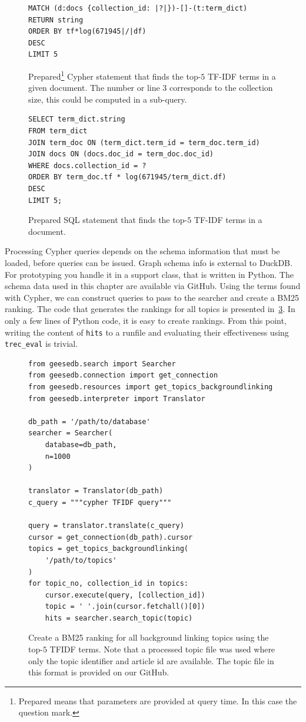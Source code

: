 \begin{figure}
	\begin{verbatim}
MATCH (d:docs {collection_id: |?|})-[]-(t:term_dict)
RETURN string
ORDER BY tf*log(671945|/|df)
DESC
LIMIT 5
	\end{verbatim}
	\caption{Prepared\footnote{Prepared means that parameters are provided at query time. In this case the question mark.} Cypher statement that finds the top-$5$ TF-IDF terms in a given document. The number or line 3 corresponds to the collection size, this could be computed in a sub-query.}
	\label{fig:tfidf-cypher}
\end{figure}
\begin{figure}
	\begin{verbatim}
SELECT term_dict.string
FROM term_dict
JOIN term_doc ON (term_dict.term_id = term_doc.term_id)
JOIN docs ON (docs.doc_id = term_doc.doc_id)
WHERE docs.collection_id = ?
ORDER BY term_doc.tf * log(671945/term_dict.df)
DESC
LIMIT 5;
	\end{verbatim}
	\caption{Prepared SQL statement that finds the top-$5$ TF-IDF terms in a document.}
	\label{fig:tfidf}
\end{figure}
Processing Cypher queries depends on the schema information that must be loaded, before queries can be issued. Graph schema info is external to DuckDB. For prototyping you handle it in a support class, that is written in Python. The schema data used in this chapter are available via GitHub. Using the terms found with Cypher, we can construct queries to pass to the searcher and create a BM25 ranking. The code that generates the rankings for all topics is presented in~\cref{fig:code_bm25_background_linking}. In only a few lines of Python code, it is easy to create rankings. From this point, writing the content of \texttt{hits} to a runfile and evaluating their effectiveness using \texttt{trec\_eval} is trivial. 

\begin{figure}
	\begin{verbatim}
from geesedb.search import Searcher
from geesedb.connection import get_connection
from geesedb.resources import get_topics_backgroundlinking
from geesedb.interpreter import Translator

db_path = '/path/to/database'
searcher = Searcher(
    database=db_path, 
    n=1000
)

translator = Translator(db_path)
c_query = """cypher TFIDF query"""

query = translator.translate(c_query)
cursor = get_connection(db_path).cursor
topics = get_topics_backgroundlinking(
    '/path/to/topics'
)
for topic_no, collection_id in topics:
    cursor.execute(query, [collection_id])
    topic = ' '.join(cursor.fetchall()[0])
    hits = searcher.search_topic(topic)
	\end{verbatim}
	\caption{Create a BM25 ranking for all background linking topics using the top-$5$ TFIDF terms. Note that a processed topic file was used where only the topic identifier and article id are available. The topic file in this format is provided on our GitHub.}
	\label{fig:code_bm25_background_linking}
\end{figure}

